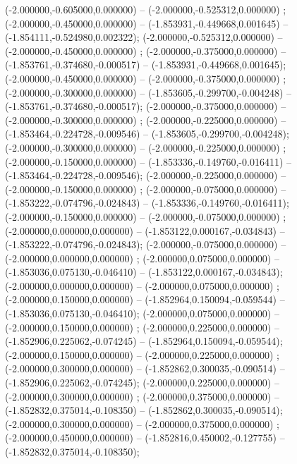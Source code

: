  (-2.000000,-0.605000,0.000000) -- (-2.000000,-0.525312,0.000000) ;
 (-2.000000,-0.450000,0.000000) -- (-1.853931,-0.449668,0.001645) -- (-1.854111,-0.524980,0.002322);
 (-2.000000,-0.525312,0.000000) -- (-2.000000,-0.450000,0.000000) ;
 (-2.000000,-0.375000,0.000000) -- (-1.853761,-0.374680,-0.000517) -- (-1.853931,-0.449668,0.001645);
 (-2.000000,-0.450000,0.000000) -- (-2.000000,-0.375000,0.000000) ;
 (-2.000000,-0.300000,0.000000) -- (-1.853605,-0.299700,-0.004248) -- (-1.853761,-0.374680,-0.000517);
 (-2.000000,-0.375000,0.000000) -- (-2.000000,-0.300000,0.000000) ;
 (-2.000000,-0.225000,0.000000) -- (-1.853464,-0.224728,-0.009546) -- (-1.853605,-0.299700,-0.004248);
 (-2.000000,-0.300000,0.000000) -- (-2.000000,-0.225000,0.000000) ;
 (-2.000000,-0.150000,0.000000) -- (-1.853336,-0.149760,-0.016411) -- (-1.853464,-0.224728,-0.009546);
 (-2.000000,-0.225000,0.000000) -- (-2.000000,-0.150000,0.000000) ;
 (-2.000000,-0.075000,0.000000) -- (-1.853222,-0.074796,-0.024843) -- (-1.853336,-0.149760,-0.016411);
 (-2.000000,-0.150000,0.000000) -- (-2.000000,-0.075000,0.000000) ;
 (-2.000000,0.000000,0.000000) -- (-1.853122,0.000167,-0.034843) -- (-1.853222,-0.074796,-0.024843);
 (-2.000000,-0.075000,0.000000) -- (-2.000000,0.000000,0.000000) ;
 (-2.000000,0.075000,0.000000) -- (-1.853036,0.075130,-0.046410) -- (-1.853122,0.000167,-0.034843);
 (-2.000000,0.000000,0.000000) -- (-2.000000,0.075000,0.000000) ;
 (-2.000000,0.150000,0.000000) -- (-1.852964,0.150094,-0.059544) -- (-1.853036,0.075130,-0.046410);
 (-2.000000,0.075000,0.000000) -- (-2.000000,0.150000,0.000000) ;
 (-2.000000,0.225000,0.000000) -- (-1.852906,0.225062,-0.074245) -- (-1.852964,0.150094,-0.059544);
 (-2.000000,0.150000,0.000000) -- (-2.000000,0.225000,0.000000) ;
 (-2.000000,0.300000,0.000000) -- (-1.852862,0.300035,-0.090514) -- (-1.852906,0.225062,-0.074245);
 (-2.000000,0.225000,0.000000) -- (-2.000000,0.300000,0.000000) ;
 (-2.000000,0.375000,0.000000) -- (-1.852832,0.375014,-0.108350) -- (-1.852862,0.300035,-0.090514);
 (-2.000000,0.300000,0.000000) -- (-2.000000,0.375000,0.000000) ;
 (-2.000000,0.450000,0.000000) -- (-1.852816,0.450002,-0.127755) -- (-1.852832,0.375014,-0.108350);
